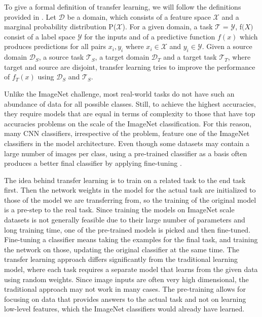 To give a formal definition of transfer learning, we will follow the definitions provided in \citep{transferSurvey2010}. Let $\mathcal{D}$ be a domain, which consists of a feature space $\mathcal{X}$ and a marginal probability distribution P($\mathcal{X}$). For a given domain, a task $\mathcal{T}$ = {$\mathcal{Y}$, f$\mathcal(X)$} consist of a label space $\mathcal{Y}$ for the inputs and of a predictive function $f(x)$ which produces predictions for all pairs ${x_i, y_i}$ where $x_i \in \mathcal{X}$ and $y_i \in \mathcal{Y}$. Given a source domain $\mathcal{D}_S$, a source task $\mathcal{T}_S$, a target domain $\mathcal{D}_T$ and a target task $\mathcal{T}_T$, where target and source are disjoint, transfer learning tries to improve the performance of $f_T(x)$ using $\mathcal{D}_S$ and $\mathcal{T}_S$.

Unlike the ImageNet challenge, most real-world tasks do not have such an abundance of data for all possible classes. Still, to achieve the highest accuracies, they require models that are equal in terms of complexity to those that have top accuracies problems on the scale of the ImageNet classification. For this reason, many CNN classifiers, irrespective of the problem, feature one of the ImageNet classifiers in the model architecture. Even though some datasets may contain a large number of images per class, using a pre-trained classifier as a basis often produces a better final classifier by applying fine-tuning \citep{betterTransfer}.

The idea behind transfer learning is to train on a related task to the end task first. Then the network weights in the model for the actual task are initialized to those of the model we are transferring from, so the training of the original model is a pre-step to the real task. Since training the models on ImageNet scale datasets is not generally feasible due to their large number of parameters and long training time, one of the pre-trained models is picked and then fine-tuned. Fine-tuning a classifier means taking the examples for the final task, and training the network on those, updating the original classifier at the same time. The transfer learning approach differs significantly from the traditional learning model, where each task requires a separate model that learns from the given data using random weights. Since image inputs are often very high dimensional, the traditional approach may not work in many cases. The pre-training allows for focusing on data that provides answers to the actual task and not on learning low-level features, which the ImageNet classifiers would already have learned.

